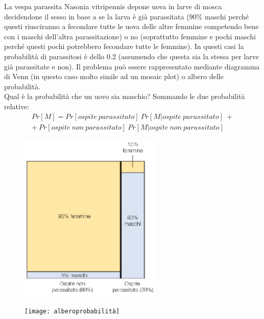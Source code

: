 \documentclass[10pt, draft]{book}
\newcounter{example}[section]
\begin{document}
\begin{example}
    La vespa parassita Nasonia vitripennis depone uova in larve di mosca decidendone il sesso in base a se la larva è già parassitata (90\% maschi perché questi riusciranno a fecondare tutte le uova delle altre femmine competendo bene con i maschi dell'altra parassitazione) o no (soprattutto femmine e pochi maschi perché questi pochi potrebbero fecondare tutte le femmine). In questi casi la probabilità di parassitosi è dello 0.2 (assumendo che questa sia la stessa per larve già parassitate e non). Il problema può essere rappresentato mediante diagramma di Venn (in questo caso molto simile ad un mosaic plot) o albero delle probabilità. 
    \\
    Qual è la probabilità che un uovo sia maschio? Sommando le due probabilità relative:
    \begin{equation}
        \begin{gathered}
            Pr[M]=Pr[ospite\ parassitato]\ Pr[M|ospite\ parassitato]\ + \\ +\ Pr[ospite\ non\ parassitato]\ Pr[M|ospite\ non\ parassitato]
        \end{gathered}
    \end{equation}
\end{example}
\clearpage
\begin{figure}[h]\label{fig5.8-1}
    \centering
    \includegraphics[width=0.6\textwidth]{fig5.8-1}
    \caption{\small{}}
\end{figure}
\begin{figure}[h]\label{alberoprobabilità}
    \centering
    \texttt{[image: alberoprobabilità]}
    \caption{\small{}}
\end{figure}
 
\end{document}
